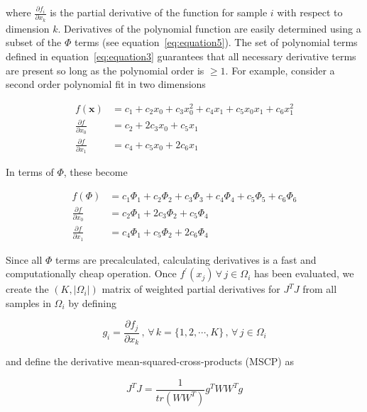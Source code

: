 where $\frac{\partial f_i}{\partial x_k}$ is the partial derivative of the
function for sample $i$ with respect to dimension $k$.
Derivatives of the polynomial function are easily determined using a subset of
the $\Phi$ terms (see equation~\ref{eq:equation5}).
The set of polynomial terms defined in equation~\ref{eq:equation3} guarantees
that all necessary derivative terms are present so long as the polynomial order
is $\ge 1$.
For example, consider a second order polynomial fit in two dimensions

\begin{align}
    f(\bm{x}) &= c_1 + c_2 x_0 + c_3 x_0^2 + c_4 x_1 + c_5 x_0 x_1 + c_6 x_1^2
    \nonumber \\
    \frac{\partial f}{\partial x_0} &= c_2 + 2 c_3 x_0 + c_5 x_1 \nonumber \\
    \frac{\partial f}{\partial x_1} &= c_4 + c_5 x_0 + 2 c_6 x_1 \nonumber
\end{align}

In terms of $\Phi$, these become

\begin{align}
    f(\Phi) &= c_1 \Phi_1 + c_2 \Phi_2 + c_3 \Phi_3 + c_4 \Phi_4 +
               c_5 \Phi_5 + c_6 \Phi_6 \nonumber \\
    \frac{\partial f}{\partial x_0} &= c_2 \Phi_1 + 2 c_3 \Phi_2 + c_5 \Phi_4
    \nonumber \\
    \frac{\partial f}{\partial x_1} &= c_4 \Phi_1 + c_5 \Phi_2 + 2 c_6 \Phi_4
    \nonumber
\end{align}

Since all $\Phi$ terms are precalculated, calculating derivatives is a fast and
computationally cheap operation.
Once $f^{\prime}(x_j)\,\forall\, j \in \Omega_i$ has been evaluated, we create
the $(K, |\Omega_i|)$ matrix of weighted partial derivatives for $J^T J$ from
all samples in $\Omega_i$ by defining

\begin{equation}
    g_i = \frac{\partial f_j}{\partial x_k}\,,\,\forall\,
    k = \{1, 2, \cdots, K\}\,,\,\forall\,
    j \in \Omega_i
    \label{eq:equation49}
\end{equation}

and define the derivative mean-squared-cross-products (MSCP) as

\begin{equation}
    J^T J = \frac{1}{tr(W W^T)} g^T W W^T g
    \label{eq:equation50}
\end{equation}


